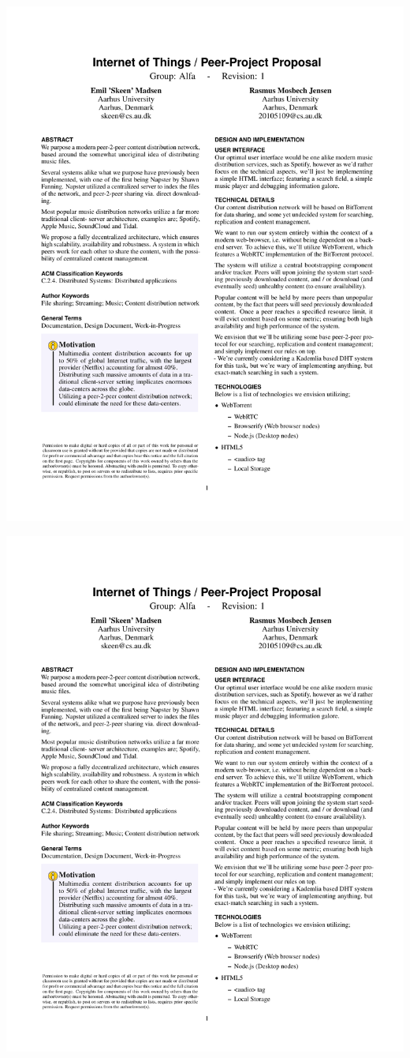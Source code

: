 \centerline{
\includegraphics[page=1, scale=0.8]{gfx/project-proposal.pdf}
}

\centerline{
\includegraphics[page=2, scale=0.8]{gfx/project-proposal.pdf}
}
